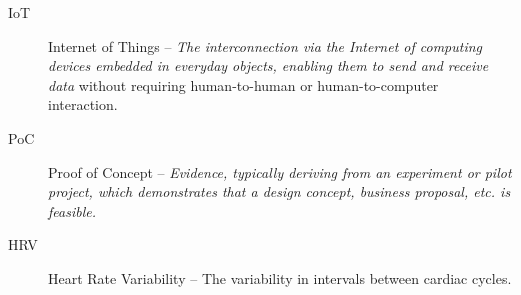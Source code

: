 \begin{description}
	\item[IoT] Internet of Things -- \textit{The interconnection via the Internet of computing devices embedded in everyday objects, enabling them to send and receive data} \cite{IoT-dictionary} without requiring human-to-human or human-to-computer interaction. \cite{IoT-definition-no-interaction}
	\item[PoC] Proof of Concept -- \textit{Evidence, typically deriving from an experiment or pilot project, which demonstrates that a design concept, business proposal, etc. is feasible.} \cite{PoC-dictionary}
	\item[HRV] Heart Rate Variability -- The variability in intervals between cardiac cycles.
\end{description}
